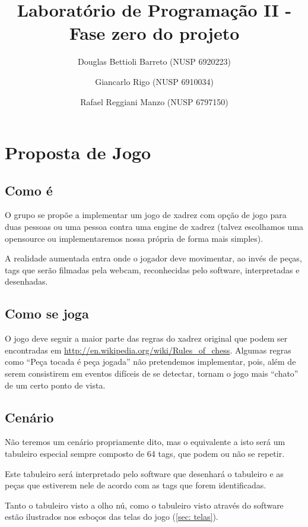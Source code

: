 \documentclass[a4paper,12pt]{book}
\title{Laborat\'orio de Programa\c c\~ao II - Fase zero do projeto}
\author{
		Douglas Bettioli Barreto (NUSP 6920223)
		\and Giancarlo Rigo (NUSP 6910034)
		\and Rafael Reggiani Manzo (NUSP 6797150)
	   }
\begin{document}
\maketitle

\section{Proposta de Jogo}
\subsection{Como \'e}
\label{sec: comoeojogo}

O grupo se prop\~oe a implementar um jogo de xadrez com op\c c\~ao de jogo para
duas pessoas ou uma pessoa contra uma engine de xadrez (talvez escolhamos uma
opensource ou implementaremos nossa pr\'opria de forma mais simples).

A realidade aumentada entra onde o jogador deve movimentar, ao inv\'es de pe\c
cas, tags que ser\~ao filmadas pela webcam, reconhecidas pelo software,
interpretadas e desenhadas.

\subsection{Como se joga}
\label{sec: comosejoga}

O jogo deve seguir a maior parte das regras do xadrez original que podem ser
encontradas em \url{http://en.wikipedia.org/wiki/Rules_of_chess}. Algumas
regras como ``Pe\c ca tocada \'e pe\c ca jogada'' n\~ao pretendemos
implementar, pois, al\'em de serem consistirem em eventos dif\'iceis de se
detectar, tornam o jogo mais ``chato'' de um certo ponto de vista.

\subsection{Cen\'ario}
\label{sec: cenario}

N\~ao teremos um cen\'ario propriamente dito, mas o equivalente a isto ser\'a um
tabuleiro especial sempre composto de 64 tags, que podem ou n\~ao se repetir.

Este tabuleiro ser\'a interpretado pelo software que desenhar\'a o tabuleiro e
as pe\c cas que estiverem nele de acordo com as tags que forem identificadas.

Tanto o tabuleiro visto a olho n\'u, como o tabuleiro visto atrav\'es do
software est\~ao ilustrados nos esbo\c cos das telas do jogo (\ref{sec: telas}).
\end{document}
